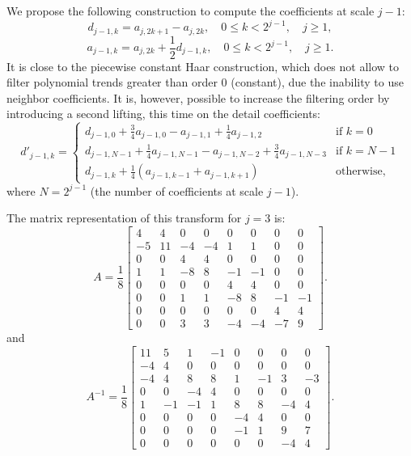 We propose the following construction to compute the coefficients at scale \( j-1 \):
\begin{equation}
\label{eq:compute_details_haar}
d_{j-1,k}=a_{j,2k+1}-a_{j,2k},\quad0\leq k<2^{j-1},\quad j\geq1,
\end{equation}
\begin{equation}
\label{eq:compute_samples_haar}
a_{j-1,k} = a_{j,2k} + \frac{1}{2} d_{j-1,k}, \quad 0 \leq k < 2^{j-1},\quad j\geq1.
\end{equation}
It is close to the piecewise constant Haar construction, which does not allow to filter polynomial trends greater than order 0 (constant), due the inability to use neighbor coefficients.
It is, however, possible to increase the filtering order by introducing a second lifting, this time on the detail coefficients:
\begin{equation}
\label{eq:compute_details_haar_2}
d'_{j-1,k}=
\begin{cases}
    d_{j-1,0}+\frac{3}{4}a_{j-1,0}-a_{j-1,1}+\frac{1}{4}a_{j-1,2} & \text{if } k=0\\
    d_{j-1,N-1}+\frac{1}{4}a_{j-1,N-1}-a_{j-1,N-2}+\frac{3}{4}a_{j-1,N-3} & \text{if } k=N-1\\
    d_{j-1,k}+\frac{1}{4}(a_{j-1,k-1}+a_{j-1,k+1}) & \text{otherwise},
\end{cases}
\end{equation}
where $N = 2^{j-1}$ (the number of coefficients at scale \( j-1 \)).

The matrix representation of this transform for \( j = 3 \) is:
\begin{equation}
A=\frac{1}{8}\left[\begin{array}{cccccccc}
4 & 4 & 0 & 0 & 0 & 0 & 0 & 0\\
-5 & 11 & -4 & -4 & 1 & 1 & 0 & 0\\
0 & 0 & 4 & 4 & 0 & 0 & 0 & 0\\
1 & 1 & -8 & 8 & -1 & -1 & 0 & 0\\
0 & 0 & 0 & 0 & 4 & 4 & 0 & 0\\
0 & 0 & 1 & 1 & -8 & 8 & -1 & -1\\
0 & 0 & 0 & 0 & 0 & 0 & 4 & 4\\
0 & 0 & 3 & 3 & -4 & -4 & -7 & 9
\end{array}\right].
\end{equation}
and
\begin{equation}
A^{-1}=\frac{1}{8}\left[\begin{array}{cccccccc}
11 & 5 & 1 & -1 & 0 & 0 & 0 & 0\\
-4 & 4 & 0 & 0 & 0 & 0 & 0 & 0\\
-4 & 4 & 8 & 8 & 1 & -1 & 3 & -3\\
0 & 0 & -4 & 4 & 0 & 0 & 0 & 0\\
1 & -1 & -1 & 1 & 8 & 8 & -4 & 4\\
0 & 0 & 0 & 0 & -4 & 4 & 0 & 0\\
0 & 0 & 0 & 0 & -1 & 1 & 9 & 7\\
0 & 0 & 0 & 0 & 0 & 0 & -4 & 4
\end{array}\right].
\end{equation}

